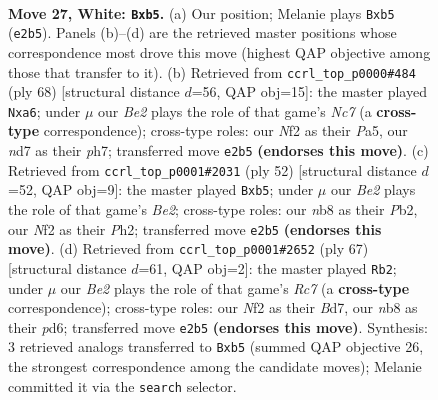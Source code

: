 \documentclass[11pt]{article}
\begin{document}
\clearpage

\begin{figure}[p]\centering
\begin{subfigure}{0.46\textwidth}\centering
\resizebox{\linewidth}{!}{%
\newchessgame
\chessboard[
  setfen={rnb3k1/3n4/8/pp1p4/8/6P1/PPP1BN2/1K5R w - - 0 27},
  showmover=false,
  pgfstyle=straightmove, color=movearrow, markmove={e2-b5}
]}
\caption{}
\end{subfigure}\hfill
\begin{subfigure}{0.46\textwidth}\centering
\resizebox{\linewidth}{!}{%
\newchessgame
\chessboard[
  setfen={1r3n2/2N2kpp/p7/P1p5/8/6P1/5P1P/4R1K1 w - - 0 35},
  showmover=false,
  pgfstyle=straightmove, color=movearrow, markmove={c7-a6}
]}
\caption{}
\end{subfigure}
\\[4pt]
\begin{subfigure}{0.46\textwidth}\centering
\resizebox{\linewidth}{!}{%
\newchessgame
\chessboard[
  setfen={3r1k2/pp4pp/n7/1b3p2/8/P7/1P2BPPP/2R3K1 w - - 0 27},
  showmover=false,
  pgfstyle=straightmove, color=movearrow, markmove={e2-b5}
]}
\caption{}
\end{subfigure}\hfill
\begin{subfigure}{0.46\textwidth}\centering
\resizebox{\linewidth}{!}{%
\newchessgame
\chessboard[
  setfen={8/3b1pkp/2nP4/8/p3N3/3B4/2r2PP1/4R1K1 b - - 3 34},
  showmover=false,
  pgfstyle=straightmove, color=movearrow, markmove={c2-b2}
]}
\caption{}
\end{subfigure}
\caption{\textbf{Move 27, White: \texttt{Bxb5}.} (a) Our position; Melanie plays \texttt{Bxb5} (\texttt{e2b5}). Panels (b)--(d) are the retrieved master positions whose correspondence most drove this move (highest QAP objective among those that transfer to it). (b) Retrieved from \texttt{ccrl\_top\_p0000\#484} (ply 68) [structural distance $d$=56, QAP obj=15]: the master played \texttt{Nxa6}; under $\mu$ our \emph{Be2} plays the role of that game's \emph{Nc7} (a \textbf{cross-type} correspondence); cross-type roles: our \emph{N}f2 as their \emph{P}a5, our \emph{n}d7 as their \emph{p}h7; transferred move \texttt{e2b5} \textbf{(endorses this move)}. (c) Retrieved from \texttt{ccrl\_top\_p0001\#2031} (ply 52) [structural distance $d$=52, QAP obj=9]: the master played \texttt{Bxb5}; under $\mu$ our \emph{Be2} plays the role of that game's \emph{Be2}; cross-type roles: our \emph{n}b8 as their \emph{P}b2, our \emph{N}f2 as their \emph{P}h2; transferred move \texttt{e2b5} \textbf{(endorses this move)}. (d) Retrieved from \texttt{ccrl\_top\_p0001\#2652} (ply 67) [structural distance $d$=61, QAP obj=2]: the master played \texttt{Rb2}; under $\mu$ our \emph{Be2} plays the role of that game's \emph{Rc7} (a \textbf{cross-type} correspondence); cross-type roles: our \emph{N}f2 as their \emph{B}d7, our \emph{n}b8 as their \emph{p}d6; transferred move \texttt{e2b5} \textbf{(endorses this move)}. Synthesis: 3 retrieved analogs transferred to \texttt{Bxb5} (summed QAP objective 26, the strongest correspondence among the candidate moves); Melanie committed it via the \texttt{search} selector.}
\label{fig:thought-m52}
\end{figure}
\end{document}
